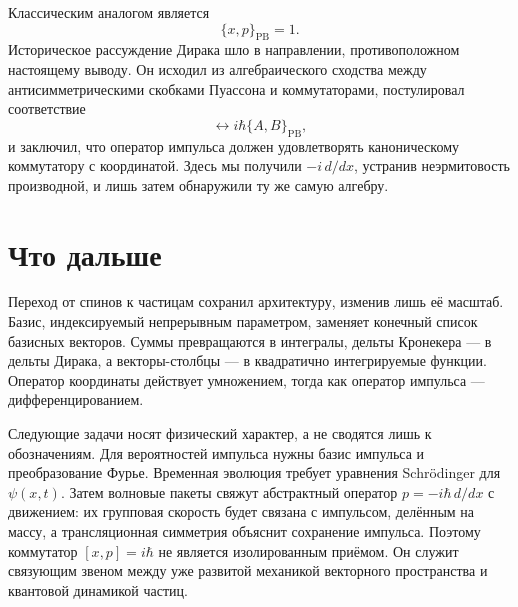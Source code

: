Классическим аналогом является
\begin{equation}
\{x,p\}_{\mathrm{PB}}=1.
\end{equation}
Историческое рассуждение Дирака шло в направлении, противоположном настоящему выводу. Он исходил из алгебраического сходства между антисимметрическими скобками Пуассона и коммутаторами, постулировал соответствие
\begin{equation}
[A,B]\longleftrightarrow i\hbar\{A,B\}_{\mathrm{PB}},
\end{equation}
и заключил, что оператор импульса должен удовлетворять каноническому коммутатору с координатой. Здесь мы получили \(-i\,d/dx\), устранив неэрмитовость производной, и лишь затем обнаружили ту же самую алгебру.

\begin{classroomqa}
\end{classroomqa}

\section{Что дальше}

Переход от спинов к частицам сохранил архитектуру, изменив лишь её масштаб. Базис, индексируемый непрерывным параметром, заменяет конечный список базисных векторов. Суммы превращаются в интегралы, дельты Кронекера — в дельты Дирака, а векторы-столбцы — в квадратично интегрируемые функции. Оператор координаты действует умножением, тогда как оператор импульса — дифференцированием.

Следующие задачи носят физический характер, а не сводятся лишь к обозначениям. Для вероятностей импульса нужны базис импульса и преобразование Фурье. Временная эволюция требует уравнения Schr\"odinger для \(\psi(x,t)\). Затем волновые пакеты свяжут абстрактный оператор \(p=-i\hbar\,d/dx\) с движением: их групповая скорость будет связана с импульсом, делённым на массу, а трансляционная симметрия объяснит сохранение импульса. Поэтому коммутатор \([x,p]=i\hbar\) не является изолированным приёмом. Он служит связующим звеном между уже развитой механикой векторного пространства и квантовой динамикой частиц.
